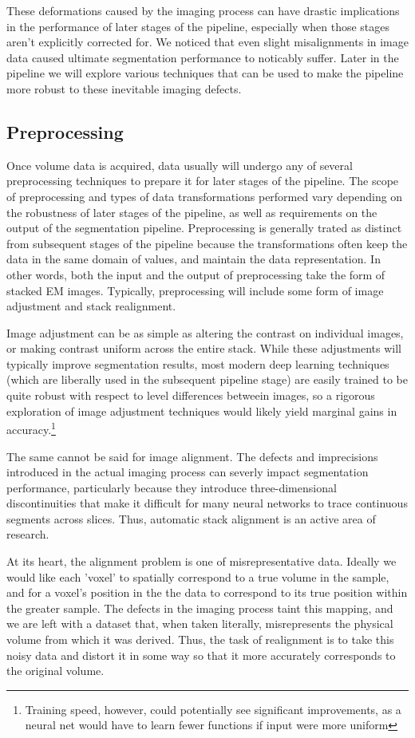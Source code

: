 These deformations caused by the imaging process can have drastic implications in the performance of later stages of the pipeline, especially when those stages aren't explicitly corrected for. We noticed that even slight misalignments in image data caused ultimate segmentation performance to noticably suffer. Later in the pipeline we will explore various techniques that can be used to make the pipeline more robust to these inevitable imaging defects.

\subsection{Preprocessing}
Once volume data is acquired, data usually will undergo any of several preprocessing techniques to prepare it for later stages of the pipeline. The scope of preprocessing and types of data transformations performed vary depending on the robustness of later stages of the pipeline, as well as requirements on the output of the segmentation pipeline. Preprocessing is generally trated as distinct from subsequent stages of the pipeline because the transformations often keep the data in the same domain of values, and maintain the data representation. In other words, both the input and the output of preprocessing take the form of stacked EM images. Typically, preprocessing will include some form of image adjustment and stack realignment.

Image adjustment can be as simple as altering the contrast on individual images, or making contrast uniform across the entire stack. While these adjustments will typically improve segmentation results, most modern deep learning techniques (which are liberally used in the subsequent pipeline stage) are easily trained to be quite robust with respect to level differences betweein images, so a rigorous exploration of image adjustment techniques would likely yield marginal gains in accuracy.\footnote{Training speed, however, could potentially see significant improvements, as a neural net would have to learn fewer functions if input were more uniform} 

The same cannot be said for image alignment. The defects and imprecisions introduced in the actual imaging process can severly impact segmentation performance, particularly because they introduce three-dimensional discontinuities that make it difficult for many neural networks to trace continuous segments across slices. Thus, automatic stack alignment is an active area of research.

At its heart, the alignment problem is one of misrepresentative data. Ideally we would like each 'voxel' to spatially correspond to a true volume in the sample, and for a voxel's position in the the data to correspond to its true position within the greater sample. The defects in the imaging process taint this mapping, and we are left with a dataset that, when taken literally, misrepresents the physical volume from which it was derived. Thus, the task of realignment is to take this noisy data and distort it in some way so that it more accurately corresponds to the original volume.

